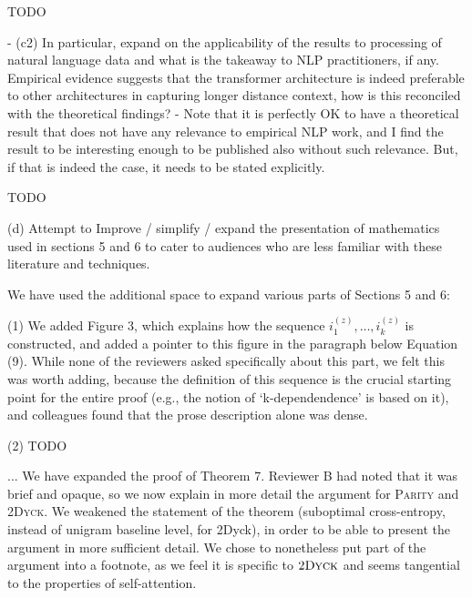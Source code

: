 \documentclass[11pt,a4paper]{article}
\newcounter{theorem}
\newcommand\response[1]{{\color{blue}#1}}
\begin{document}
\response{TODO}

- (c2) In particular, expand on the applicability of the results to
processing of natural language data and what is the takeaway to NLP
practitioners, if any. Empirical evidence suggests that the transformer
architecture is indeed preferable to other architectures in capturing longer
distance context, how is this reconciled with the theoretical findings?
- Note that it is perfectly OK to have a theoretical result that does not
have any relevance to empirical NLP work, and I find the result to be
interesting enough to be published also without such relevance. But, if that
is indeed the case, it needs to be stated explicitly.

\response{TODO}

(d) Attempt to Improve / simplify / expand the presentation of mathematics
used in sections 5 and 6 to cater to audiences who are less familiar with
these literature and techniques.

\response{We have used the additional space to expand various parts of Sections 5 and 6:}

\response{(1) We added Figure 3, which explains how the sequence $i^{(z)}_1, \dots, i^{(z)}_k$ is constructed, and added a pointer to this figure in the paragraph below Equation (9). While none of the reviewers asked specifically about this part, we felt this was worth adding, because the definition of this sequence is the crucial starting point for the entire proof (e.g., the notion of `k-dependendence' is based on it), and colleagues found that the prose description alone was dense.}

\response{(2) TODO}

\response{... We have expanded the proof of Theorem 7. Reviewer B had noted that it was brief and opaque, so we now explain in more detail the argument for \textsc{Parity} and \textsc{2Dyck}. We weakened the statement of the theorem (suboptimal cross-entropy, instead of unigram baseline level, for 2Dyck), in order to be able to present the argument in more sufficient detail. We chose to nonetheless put part of the argument into a footnote, as we feel it is specific to $2\textsc{Dyck}$ and seems tangential to the properties of self-attention.}

\end{document}
